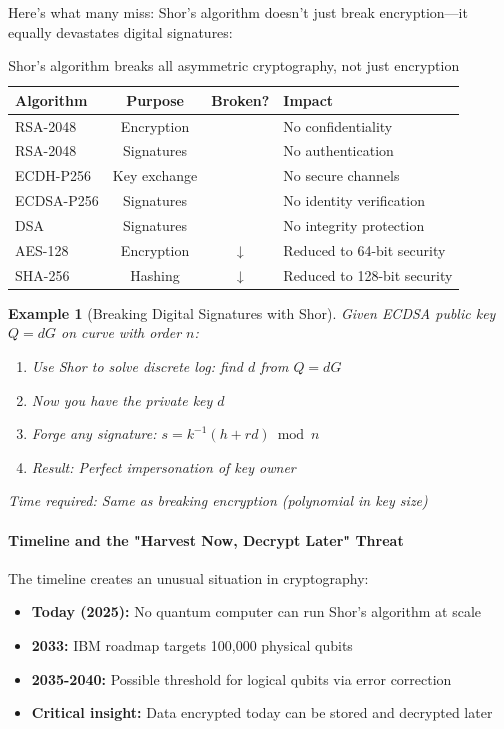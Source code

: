 \documentclass[11pt,a4paper]{article}
\newcommand{\xmark}{\ding{55}}
\newtheorem{example}{Example}
\begin{document}
Here's what many miss: Shor's algorithm doesn't just break encryption---it equally devastates digital signatures:

\begin{table}[h]
\centering
\begin{tabular}{|l|c|c|l|}
\hline
\textbf{Algorithm} & \textbf{Purpose} & \textbf{Broken?} & \textbf{Impact} \\
\hline
RSA-2048 & Encryption & \xmark & No confidentiality \\
RSA-2048 & Signatures & \xmark & No authentication \\
ECDH-P256 & Key exchange & \xmark & No secure channels \\
ECDSA-P256 & Signatures & \xmark & No identity verification \\
DSA & Signatures & \xmark & No integrity protection \\
\hline
AES-128 & Encryption & ↓ & Reduced to 64-bit security \\
SHA-256 & Hashing & ↓ & Reduced to 128-bit security \\
\hline
\end{tabular}
\caption{Shor's algorithm breaks all asymmetric cryptography, not just encryption}
\end{table}

\begin{example}[Breaking Digital Signatures with Shor]
Given ECDSA public key $Q = dG$ on curve with order $n$:
\begin{enumerate}
    \item Use Shor to solve discrete log: find $d$ from $Q = dG$
    \item Now you have the private key $d$
    \item Forge any signature: $s = k^{-1}(h + rd) \bmod n$
    \item Result: Perfect impersonation of key owner
\end{enumerate}
Time required: Same as breaking encryption (polynomial in key size)
\end{example}

\paragraph{Timeline and the "Harvest Now, Decrypt Later" Threat}

The timeline creates an unusual situation in cryptography:

\begin{itemize}
    \item \textbf{Today (2025):} No quantum computer can run Shor's algorithm at scale
    \item \textbf{2033:} IBM roadmap targets 100,000 physical qubits
    \item \textbf{2035-2040:} Possible threshold for logical qubits via error correction
    \item \textbf{Critical insight:} Data encrypted today can be stored and decrypted later
\end{itemize}
\end{document}
